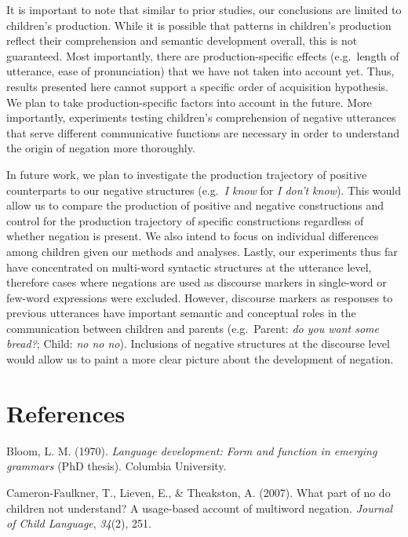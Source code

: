 \documentclass[10pt, letterpaper]{article}
\begin{document}
It is important to note that similar to prior studies, our conclusions
are limited to children's production. While it is possible that patterns
in children's production reflect their comprehension and semantic
development overall, this is not guaranteed. Most importantly, there are
production-specific effects (e.g.~length of utterance, ease of
pronunciation) that we have not taken into account yet. Thus, results
presented here cannot support a specific order of acquisition
hypothesis. We plan to take production-specific factors into account in
the future. More importantly, experiments testing children's
comprehension of negative utterances that serve different communicative
functions are necessary in order to understand the origin of negation
more thoroughly.

In future work, we plan to investigate the production trajectory of
positive counterparts to our negative structures (e.g.~\emph{I know} for
\emph{I don't know}). This would allow us to compare the production of
positive and negative constructions and control for the production
trajectory of specific constructions regardless of whether negation is
present. We also intend to focus on individual differences among
children given our methods and analyses. Lastly, our experiments thus
far have concentrated on multi-word syntactic structures at the
utterance level, therefore cases where negations are used as discourse
markers in single-word or few-word expressions were excluded. However,
discourse markers as responses to previous utterances have important
semantic and conceptual roles in the communication between children and
parents (e.g.~Parent: \emph{do you want some bread?}; Child: \emph{no no
no}). Inclusions of negative structures at the discourse level would
allow us to paint a more clear picture about the development of
negation.

\hypertarget{references}{%
\section{References}\label{references}}

\setlength{\parindent}{-0.1in} 
\setlength{\leftskip}{0.125in}

\noindent

\hypertarget{refs}{}
\leavevmode\hypertarget{ref-bloom1970language}{}%
Bloom, L. M. (1970). \emph{Language development: Form and function in
emerging grammars} (PhD thesis). Columbia University.

\leavevmode\hypertarget{ref-cameron2007part}{}%
Cameron-Faulkner, T., Lieven, E., \& Theakston, A. (2007). What part of
no do children not understand? A usage-based account of multiword
negation. \emph{Journal of Child Language}, \emph{34}(2), 251.
\end{document}
